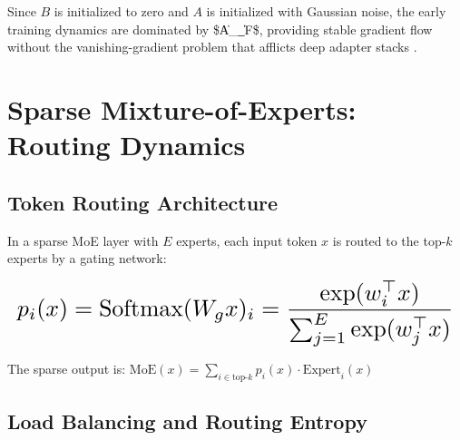 \documentclass[10pt,twocolumn,letterpaper]{article}
\begin{document}
Since $B$ is initialized to zero and $A$ is initialized with Gaussian noise, the early training dynamics are dominated by \$\|A\_\ell\|\_F\$, providing stable gradient flow without the vanishing-gradient problem that afflicts deep adapter stacks \cite{arxiv_2305_18290}.




\section{Sparse Mixture-of-Experts: Routing Dynamics}



\subsection{Token Routing Architecture}


In a sparse MoE layer with $E$ experts, each input token $x$ is routed to the top-$k$ experts by a gating network:

























\begin{equation}
\resizebox{\columnwidth}{!}{$\displaystyle
\begin{aligned}
p_i(x) = \text{Softmax}(W_g x)_i = \frac{\exp(w_i^\top x)}{\sum_{j=1}^E \exp(w_j^\top x)}
\end{aligned}
$}
\end{equation}

























The sparse output is: $\text{MoE}(x) = \sum_{i \in \text{top-}k} p_i(x) \cdot \text{Expert}_i(x)$


\subsection{Load Balancing and Routing Entropy}
\end{document}
